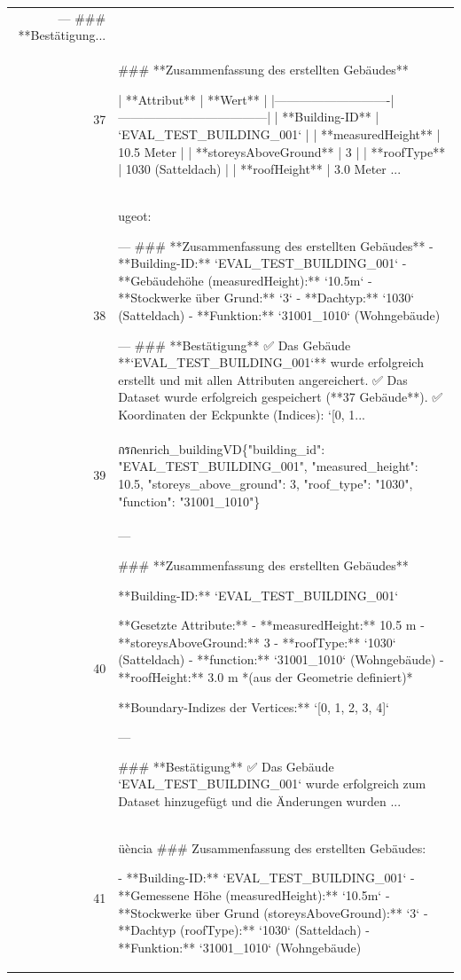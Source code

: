 \documentclass[a4paper,11pt]{article}
\begin{document}
\begin{table}[ht]
\begin{tabular}{r p{12cm}}
---
\#\#\# **Bestätigung... \\
37 & \#\#\# **Zusammenfassung des erstellten Gebäudes**

| **Attribut**               | **Wert**                          |
|----------------------------|------------------------------------|
| **Building-ID**            | `EVAL\_TEST\_BUILDING\_001`           |
| **measuredHeight**          | 10.5 Meter                         |
| **storeysAboveGround**      | 3                                  |
| **roofType**              | 1030 (Satteldach)                 |
| **roofHeight**            | 3.0 Meter     ... \\
38 & ugeot:

---
\#\#\# **Zusammenfassung des erstellten Gebäudes**
- **Building-ID:** `EVAL\_TEST\_BUILDING\_001`
- **Gebäudehöhe (measuredHeight):** `10.5m`
- **Stockwerke über Grund:** `3`
- **Dachtyp:** `1030` (Satteldach)
- **Funktion:** `31001\_1010` (Wohngebäude)

---
\#\#\# **Bestätigung**
✅ Das Gebäude **`EVAL\_TEST\_BUILDING\_001`** wurde erfolgreich erstellt und mit allen Attributen angereichert.
✅ Das Dataset wurde erfolgreich gespeichert (**37 Gebäude**).
✅ Koordinaten der Eckpunkte (Indices): `[0, 1... \\
39 &  กรกenrich\_buildingVD\{"building\_id": "EVAL\_TEST\_BUILDING\_001", "measured\_height": 10.5, "storeys\_above\_ground": 3, "roof\_type": "1030", "function": "31001\_1010"\} \\
40 & ---

\#\#\# **Zusammenfassung des erstellten Gebäudes**

**Building-ID:**
`EVAL\_TEST\_BUILDING\_001`

**Gesetzte Attribute:**
- **measuredHeight:** 10.5 m
- **storeysAboveGround:** 3
- **roofType:** `1030` (Satteldach)
- **function:** `31001\_1010` (Wohngebäude)
- **roofHeight:** 3.0 m *(aus der Geometrie definiert)*

**Boundary-Indizes der Vertices:**
`[0, 1, 2, 3, 4]`

---

\#\#\# **Bestätigung**
✅ Das Gebäude `EVAL\_TEST\_BUILDING\_001` wurde erfolgreich zum Dataset hinzugefügt und die Änderungen wurden ... \\
41 & üència
\#\#\# Zusammenfassung des erstellten Gebäudes:

- **Building-ID:** `EVAL\_TEST\_BUILDING\_001`
- **Gemessene Höhe (measuredHeight):** `10.5m`
- **Stockwerke über Grund (storeysAboveGround):** `3`
- **Dachtyp (roofType):** `1030` (Satteldach)
- **Funktion:** `31001\_1010` (Wohngebäude)


\end{tabular}
\end{table}
\end{document}
